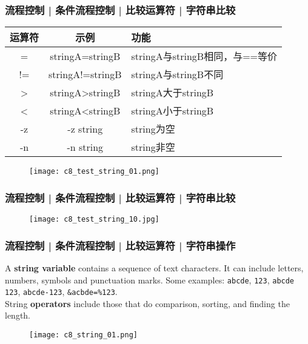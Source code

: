 \begin{frame}
  \frametitle{流程控制 | 条件流程控制 | 比较运算符 | \alert{字符串比较}}
  \begin{table}
    \centering
    \begin{tabularx}{\textwidth}{ccX}
      \hline
      \rowcolor{blue!50}运算符 & 示例 & 功能\\
      \hline
      = & stringA=stringB & stringA与stringB相同，与==等价\\
      != & stringA!=stringB & stringA与stringB不同\\
      > & stringA>stringB & stringA大于stringB\\
      < & stringA<stringB & stringA小于stringB\\
      -z & -z string & string为空\\
      -n & -n string & string非空\\
      \hline
    \end{tabularx}
  \end{table}
  \begin{figure}
    \centering
    \texttt{[image: c8\_test\_string\_01.png]}
  \end{figure}
\end{frame}

\begin{frame}
  \frametitle{流程控制 | 条件流程控制 | 比较运算符 | 字符串比较}
  \begin{figure}
    \centering
    \texttt{[image: c8\_test\_string\_10.jpg]}
  \end{figure}
\end{frame}

\begin{frame}[fragile]
  \frametitle{流程控制 | 条件流程控制 | 比较运算符 | 字符串操作}
  A \textbf{string variable} contains a sequence of text characters. It can include letters, numbers, symbols and punctuation marks. Some examples: \verb|abcde|, \verb|123|, \verb|abcde 123|, \verb|abcde-123|, \verb|&acbde=%123|.\\
  \vspace{0.2cm}
  String \textbf{operators} include those that do comparison, sorting, and finding the length.
  \begin{figure}
    \centering
    \texttt{[image: c8\_string\_01.png]}
  \end{figure}
\end{frame}


